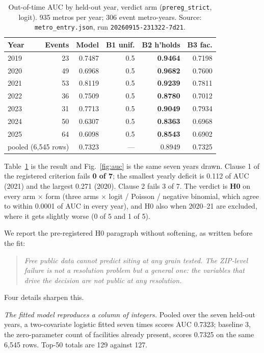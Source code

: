 \documentclass[conference]{IEEEtran}
\begin{document}
\begin{table}[!t]
\caption{Out-of-time AUC by held-out year, verdict arm
(\texttt{prereg\_strict}, logit). 935 metros per year; 306 event metro-years.
Source: \texttt{metro\_entry.json}, run \texttt{20260915-231322-7d21}.}
\label{tab:metro}
\centering
\begin{tabular}{lrrrrr}
\hline
Year & Events & Model & B1 unif. & B2 h'holds & B3 fac. \\
\hline
2019 & 23 & 0.7487 & 0.5 & \textbf{0.9464} & 0.7198 \\
2020 & 49 & 0.6968 & 0.5 & \textbf{0.9682} & 0.7600 \\
2021 & 53 & 0.8119 & 0.5 & \textbf{0.9239} & 0.7811 \\
2022 & 36 & 0.7509 & 0.5 & \textbf{0.8780} & 0.7012 \\
2023 & 31 & 0.7713 & 0.5 & \textbf{0.9049} & 0.7934 \\
2024 & 50 & 0.6307 & 0.5 & \textbf{0.8363} & 0.6968 \\
2025 & 64 & 0.6098 & 0.5 & \textbf{0.8543} & 0.6902 \\
\hline
\multicolumn{2}{l}{pooled (6{,}545 rows)} & 0.7323 & --- & 0.8949 & 0.7325 \\
\hline
\end{tabular}
\end{table}

Table~\ref{tab:metro} is the result and Fig.~\ref{fig:auc} is the same seven
years drawn. Clause 1 of the registered criterion
fails \textbf{0 of 7}; the smallest yearly deficit is 0.112 of AUC (2021) and
the largest 0.271 (2020). Clause 2 fails 3 of 7. The verdict is \textbf{H0} on
every arm $\times$ form (three arms $\times$ logit / Poisson / negative
binomial, which agree to within 0.0001 of AUC in every year), and H0 also when
2020--21 are excluded, where it gets slightly worse (0 of 5 and 1 of 5).

We report the pre-registered H0 paragraph without softening, as written before
the fit:

\begin{quote}
\emph{Free public data cannot predict siting at any grain tested. The
ZIP-level failure is not a resolution problem but a general one: the variables
that drive the decision are not public at any resolution.}
\end{quote}

Four details sharpen this.

\emph{The fitted model reproduces a column of integers.} Pooled over the seven
held-out years, a two-covariate logistic fitted seven times scores AUC 0.7323;
baseline 3, the zero-parameter count of facilities already present, scores
0.7325 on the same 6{,}545 rows. Top-50 totals are 129 against 127.
\end{document}
